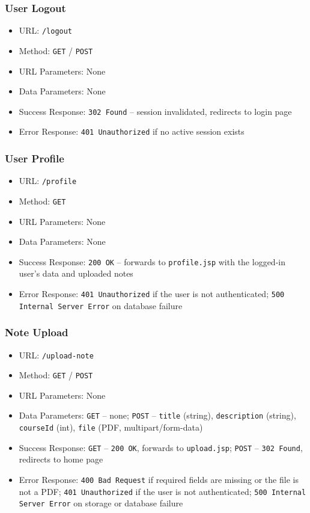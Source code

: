 \subsubsection*{User Logout}

\begin{itemize}
    \item URL: \texttt{/logout}
    \item Method: \texttt{GET} / \texttt{POST}
    \item URL Parameters: None
    \item Data Parameters: None
    \item Success Response: \texttt{302 Found} -- session invalidated, redirects to login page
    \item Error Response: \texttt{401 Unauthorized} if no active session exists
\end{itemize}

\subsubsection*{User Profile}

\begin{itemize}
    \item URL: \texttt{/profile}
    \item Method: \texttt{GET}
    \item URL Parameters: None
    \item Data Parameters: None
    \item Success Response: \texttt{200 OK} -- forwards to \texttt{profile.jsp} with the logged-in user's data and uploaded notes
    \item Error Response: \texttt{401 Unauthorized} if the user is not authenticated; \texttt{500 Internal Server Error} on database failure
\end{itemize}

\subsubsection*{Note Upload}

\begin{itemize}
    \item URL: \texttt{/upload-note}
    \item Method: \texttt{GET} / \texttt{POST}
    \item URL Parameters: None
    \item Data Parameters: \texttt{GET} -- none; \texttt{POST} -- \texttt{title} (string), \texttt{description} (string), \texttt{courseId} (int), \texttt{file} (PDF, multipart/form-data)
    \item Success Response: \texttt{GET} -- \texttt{200 OK}, forwards to \texttt{upload.jsp}; \texttt{POST} -- \texttt{302 Found}, redirects to home page
    \item Error Response: \texttt{400 Bad Request} if required fields are missing or the file is not a PDF; \texttt{401 Unauthorized} if the user is not authenticated; \texttt{500 Internal Server Error} on storage or database failure
\end{itemize}

